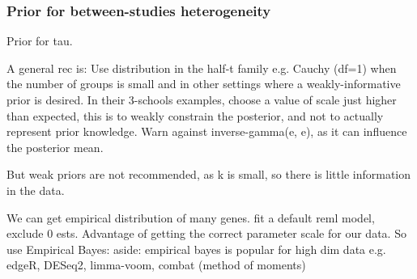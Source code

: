 \subsubsection{Prior for between-studies heterogeneity}

\begin{outline}

Prior for tau.

\1 A general rec is: Use distribution in the half-t family e.g. Cauchy (df=1) when the number of groups is small and in other settings where a weakly-informative prior is desired.
    \2 In their 3-schools examples, choose a value of scale just higher than expected, this is to weakly constrain the posterior, and not to actually represent prior knowledge.
    \2 Warn against inverse-gamma(e, e), as it can influence the posterior mean.

\1 But weak priors are not recommended, as k is small, so there is little information in the data.

\1 We can get empirical distribution of many genes.
    \2 fit a default reml model, exclude 0 ests.
\1 Advantage of getting the correct parameter scale for our data.
\1 So use Empirical Bayes:
    \2 aside: empirical bayes is popular for high dim data e.g. edgeR, DESeq2, limma-voom, combat (method of moments)


\end{outline}
